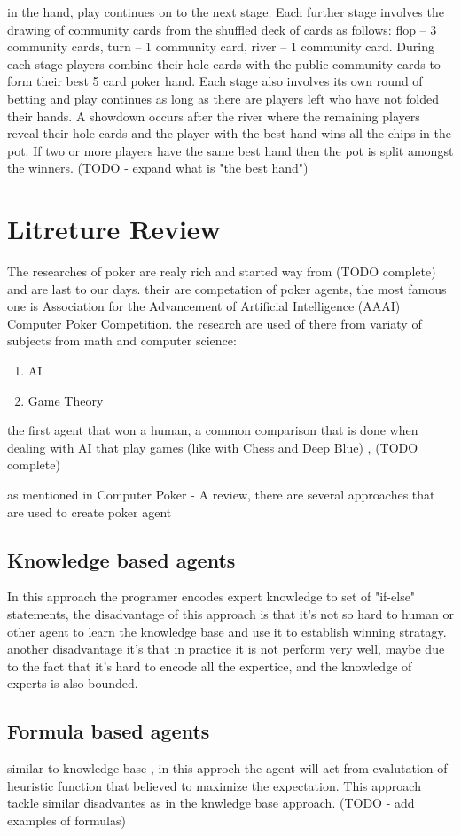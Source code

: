 \documentclass{article}
\begin{document}
in the hand, play continues on to the next stage. Each further stage involves the drawing of community cards from the
shuffled deck of cards as follows: flop – 3 community cards, turn – 1 community card, river – 1 community card.
During each stage players combine their hole cards with the public community cards to form their best 5 card poker
hand. Each stage also involves its own round of betting and play continues as long as there are players left who have not
folded their hands. A showdown occurs after the river where the remaining players reveal their hole cards and the player
with the best hand wins all the chips in the pot. If two or more players have the same best hand then the pot is split
amongst the winners.
(TODO - expand what is "the best hand")
\section{Litreture Review}
The researches of poker are realy rich and started way from (TODO complete) and are last to our days.
their are competation of poker agents, the most famous one is Association for the Advancement of Artificial Intelligence (AAAI) Computer Poker Competition.
the research are used of there from variaty of subjects from math and computer science:
\begin{enumerate}
\item AI
\item Game Theory
\end{enumerate}
the first agent that won a human, a common comparison that is done when dealing with AI that play games (like with Chess and Deep Blue) , (TODO complete)

as mentioned in Computer Poker - A review, there are several approaches that are used to create poker agent\\
\subsection{Knowledge based agents}
In this approach the programer encodes expert knowledge to set of "if-else" statements, the disadvantage of this approach is that it's not so hard to human or other agent to learn the knowledge base and use it to establish winning stratagy. another disadvantage it's that in practice it is not perform very well, maybe due to the fact that it's hard to encode all the expertice, and the knowledge of experts is also bounded.
\subsection{Formula based agents}
similar to knowledge base , in this approch the agent will act from evalutation of heuristic function that believed to maximize the expectation.
This approach tackle similar disadvantes as in the knwledge base approach.
(TODO - add examples of formulas)
\end{document}

